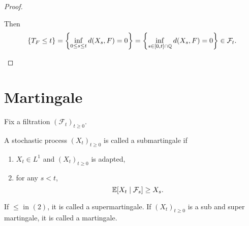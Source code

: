 \begin{exam}
\begin{proof}
\begin{enumerate}[label=(\arabic{*})]
            \noindent Then
            \begin{equation*}
                \left\{T_F \leq t\right\} = \left\{\inf_{0 \leq s \leq t} d(X_s,F) = 0\right\} =\left\{\inf_{s \in [0,t]\cap\mathbb{Q}} d(X_s,F) = 0\right\} \in \mathcal{F}_t. \qedhere
            \end{equation*}
        \end{enumerate}
    \end{proof}
\end{exam}

\section{Martingale}

Fix a filtration $(\mathcal{F}_t)_{t \geq 0}$.

\begin{defn}
    A stochastic process $(X_t)_{t \geq 0}$ is called a submartingale if
    \begin{enumerate}[label=(\arabic{*})]
        \item $X_t \in L^1$ and $(X_t)_{t \geq 0}$ is adapted,
        \item for any $s < t$,
        \begin{equation*}
            \mathbb{E}[X_t \mid \mathcal{F}_s] \geq X_s.
        \end{equation*}
    \end{enumerate}
    If $\leq$ in $(2)$, it is called a supermartingale. If $(X_t)_{t \geq 0}$ is a sub and super martingale, it is called a martingale.
\end{defn}

